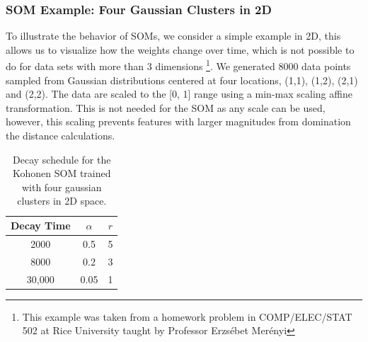 \subsubsection{SOM Example: Four Gaussian Clusters in 2D}

To illustrate the behavior of SOMs, we consider a simple example in 2D, this allows us to visualize how the weights change over time, which is not possible to do for data sets with more than 3 dimensions \footnote{This example was taken from a homework problem in COMP/ELEC/STAT 502 at Rice University taught by Professor Erzsébet Merényi}. We generated 8000 data points sampled from Gaussian distributions centered at four locations, (1,1), (1,2), (2,1) and (2,2). The data are scaled to the [0, 1] range using a min-max scaling affine transformation. This is not needed for the SOM as any scale can be used, however, this scaling prevents features with larger magnitudes from domination the distance calculations.

\begin{table}[htbp]
    \centering
    \begin{tabular}{c|c|c}
         Decay Time &  $\alpha$ & $r$ \\ \hline
         2000 &  0.5 &  5 \\
         8000 & 0.2 & 3 \\
         30,000 & 0.05 & 1 \\

    \end{tabular}
    \caption{Decay schedule for the Kohonen SOM trained with four gaussian clusters in 2D space.}
    \label{tab:2d_gauss_4class_parm}
\end{table}

